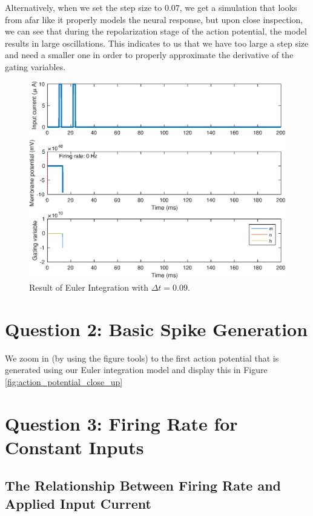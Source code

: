 \documentclass[11pt, oneside]{article}
\begin{document}
Alternatively, when we set the step size to $0.07$, we get a simulation that looks from afar like it properly models the neural response, but upon close inspection, we can see that during the repolarization stage of the action potential, the model results in large oscillations. This indicates to us that we have too large a step size and need a smaller one in order to properly approximate the derivative of the gating variables.

\begin{figure}[ht!]
\centering
\includegraphics[width=1\textwidth]{simulate_hh_dt_9.eps}
\caption{Result of Euler Integration with $\Delta t = 0.09$.}
\label{fig:euler_integration_nine}
\end{figure}

\section{Question 2: Basic Spike Generation}
We zoom in (by using the figure tools) to the first action potential that is generated using our Euler integration model and display this in Figure \ref{fig:action_potential_close_up}

\section{Question 3: Firing Rate for Constant Inputs}

\subsection{The Relationship Between Firing Rate and Applied Input Current}
\end{document}

